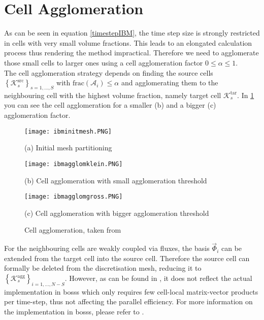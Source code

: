 	\section{Cell Agglomeration}
	\label{cellAgglomeration}
	As can be seen in equation \eqref{timestepIBM}, the time step size is strongly restricted in cells with very small volume fractions. This leads to an elongated calculation process thus rendering the method impractical. Therefore we need to agglomerate those small cells to larger ones using a cell agglomeration factor $0 \leq \alpha \leq 1$. \\
	The cell agglomeration strategy depends on finding the source cells $\left\{\mathcal{K}_s^\text{src} \right\}_{s=1,...,S}$ with $\text{frac}(\mathcal{A}_i) \leq \alpha$ and agglomerating them to the neighbouring cell with the highest volume fraction, namely target cell $\mathcal{K}_s^\text{tar}$. In \cref{fig:agglomeration} you can see the cell agglomeration for a smaller (b) and a bigger (c) agglomeration factor. \\
	\begin{figure}[htp]
		\centering
		\begin{minipage}[b]{0.3\textwidth}
			\centering
			\texttt{[image: ibminitmesh.PNG]}
			\caption*{(a) Initial mesh partitioning \newline \newline}
			\label{fig:init}
		\end{minipage}%
		\begin{minipage}[b]{0.3\textwidth}
			\centering
			\texttt{[image: ibmagglomklein.PNG]}
			\caption*{(b) Cell agglomeration with small agglomeration threshold}
			\label{fig:agglomgklein}
		\end{minipage}
		\begin{minipage}[b]{0.3\textwidth}
			\centering
			\texttt{[image: ibmagglomgross.PNG]}
			\caption*{(c) Cell agglomeration with bigger agglomeration threshold}
			\label{fig:agglomgross}
		\end{minipage}%
		\caption{Cell agglomeration, taken from \cite{paper}}\label{fig:agglomeration}
	\end{figure}
	
	For the neighbouring cells are weakly coupled via fluxes, the basis $\vec{\Phi}_i$ can be extended from the target cell into the source cell. Therefore the source cell can formally be deleted from the discretisation mesh, reducing it to $\left\{\mathcal{K}_s^\text{agg} \right\}_{i=1,...,N-S}$.
	However, as can be found in \textcite{paper}, it does not reflect the actual implementation in \gls{bosss} which only requires few cell-local matrix-vector products per time-step, thus not affecting the parallel efficiency. For more information on the implementation in \gls{bosss}, please refer to \cite{paper}.
	
